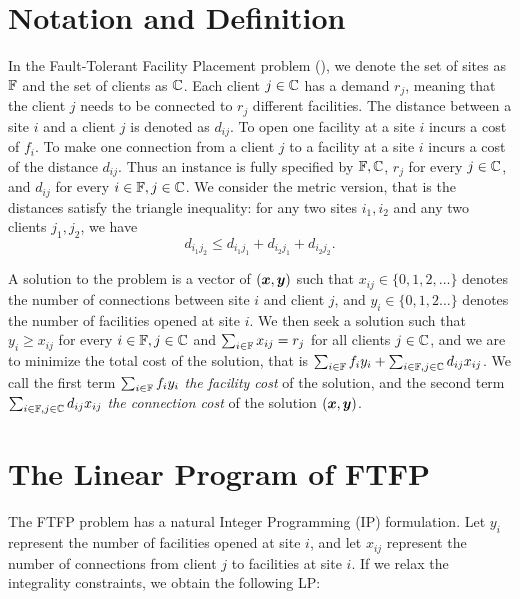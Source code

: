 \documentclass[oneside,final]{ucr}
\begin{document}
\section{Notation and Definition}
In the Fault-Tolerant Facility Placement problem ({\FTFP}),
we denote the set of sites as $\mathbb{F}$ and the set of
clients as $\mathbb{C}$. Each client $j \in \mathbb{C}$ has
a demand $r_j$, meaning that the client $j$ needs to be
connected to $r_j$ different facilities. The distance
between a site $i$ and a client $j$ is denoted as
$d_{ij}$. To open one facility at a site $i$ incurs a cost
of $f_i$. To make one connection from a client $j$ to a
facility at a site $i$ incurs a cost of the distance
$d_{ij}$. Thus an {\FTFP} instance is fully specified by
$\mathbb{F}, \mathbb{C}$, $r_j$ for every $j\in\mathbb{C}$,
and $d_{ij}$ for every $i\in\mathbb{F},j\in\mathbb{C}$. We
consider the metric version, that is the distances satisfy
the triangle inequality: for any two sites $i_1,i_2$ and any
two clients $j_1,j_2$, we have
\begin{equation*}
  d_{i_1 j_2} \leq d_{i_1 j_1} + d_{i_2 j_1} + d_{i_2 j_2}.
\end{equation*} 

A solution to the {\FTFP} problem is a vector of $(\boldsymbol{x},
\boldsymbol{y})$ such that $x_{ij} \in \{0, 1, 2, \ldots\}$ denotes
the number of connections between site $i$ and client $j$,
and $y_i \in \{0, 1, 2\ldots\}$ denotes the number of
facilities opened at site $i$. We then seek a solution such
that $y_i \geq x_{ij}$ for every $i \in \mathbb{F}, j \in
\mathbb{C}$ and $\sum_{i\in\mathbb{F}} x_{ij} = r_j$ for all
clients $j \in \mathbb{C}$, and we are to minimize the total
cost of the solution, that is $\sum_{i \in \mathbb{F}} f_i
y_i + \sum_{i \in \mathbb{F}, j \in \mathbb{C}} d_{ij}
x_{ij}$. We call the first term $\sum_{i \in \mathbb{F}} f_i
y_i$ \emph{the facility cost} of the solution, and the
second term $\sum_{i \in \mathbb{F}, j \in \mathbb{C}} d_{ij}
x_{ij}$ \emph{the connection cost} of the solution $(\boldsymbol{x},
\boldsymbol{y})$.

\section{The Linear Program of FTFP}
The FTFP problem has a natural Integer Programming (IP)
formulation. Let $y_i$ represent the number of facilities
opened at site $i$, and let $x_{ij}$ represent the number of
connections from client $j$ to facilities at site $i$. If we
relax the integrality constraints, we obtain the following
LP:
\end{document}

